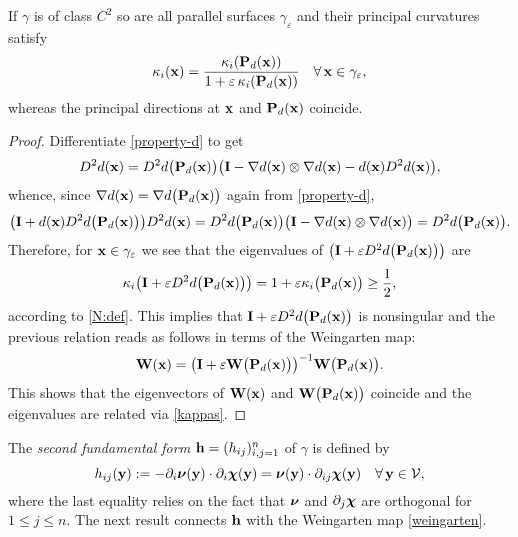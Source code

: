 \begin{lemma}\label{L:curv-parallel}
If $\gamma$ is of class $C^2$  so are all parallel surfaces $\gamma_\varepsilon$ and
their principal curvatures satisfy
%
\begin{equation}\label{kappas}
  \kappa_i({\bf x}) = \frac{\kappa_i({\bf P}_d({\bf x}))}{1+\varepsilon \, \kappa_i({\bf P}_d({\bf x}))}
  \quad\forall \, {\bf x}\in\gamma_\varepsilon, 
\end{equation}
%
whereas the principal directions at ${\bf x}$ and ${\bf P}_d({\bf x})$ coincide.
\end{lemma}
%
\begin{proof}  
Differentiate \eqref{property-d} to get
%
\[
D^2 d({\bf x}) = D^2d \big( {\bf P}_d({\bf x}) \big) \big({\bf I} - \nabla d({\bf x}) \otimes \nabla d({\bf x})
- d({\bf x}) D^2 d({\bf x}) \big),
\]
%
whence, since $\nabla d({\bf x}) = \nabla d \big({\bf P}_d({\bf x}) \big)$ again from
\eqref{property-d},
%
\[
\big( {\bf I} + d({\bf x}) D^2 d\big({\bf P}_d({\bf x}) \big) \big) D^2 d({\bf x})
= D^2 d\big({\bf P}_d({\bf x}) \big) \big( {\bf I} - \nabla d({\bf x}) \otimes \nabla d({\bf x}) \big)
= D^2 d\big({\bf P}_d({\bf x}) \big).
\]
%
Therefore, for ${\bf x}\in\gamma_\varepsilon$ we see that the eigenvalues of
$\big( {\bf I} + \varepsilon D^2 d\big({\bf P}_d({\bf x}) \big) \big)$ are
%
\[
\kappa_i\big( {\bf I} + \varepsilon D^2 d\big({\bf P}_d({\bf x}) \big) \big)=
1+\varepsilon \kappa_i \big({\bf P}_d({\bf x}) \big) \ge \frac12,
\]
%
according to \eqref{N:def}.
This implies that ${\bf I} + \varepsilon D^2 d\big({\bf P}_d({\bf x}) \big)$ is nonsingular and
the previous relation reads as follows in terms of the Weingarten map:
%
\[
{\bf W}({\bf x}) = \big( {\bf I} + \varepsilon {\bf W}\big({\bf P}_d({\bf x}) \big) \big)^{-1}
{\bf W} \big({\bf P}_d({\bf x}) \big).
\]
%
This shows that the eigenvectors of ${\bf W}({\bf x})$ and ${\bf W} \big({\bf P}_d({\bf x}) \big)$
coincide and the eigenvalues are related via \eqref{kappas}.
\end{proof}

The {\it second fundamental form}
${\bf h} = (h_{ij})_{i,j=1}^n$ of $\gamma$ is defined by
%
\[
h_{ij}({\bf y}) := -\partial_i {\boldsymbol \nu}({\bf y})\cdot\partial_i{\boldsymbol \chi}({\bf y})
= {\boldsymbol \nu}({\bf y}) \cdot \partial_{ij} {\boldsymbol \chi}({\bf y})
\quad\forall \, {\bf y}\in\mathcal{V},
\]
%
where the last equality relies on the fact that ${\boldsymbol \nu}$ and $\partial_j{\boldsymbol \chi}$
are orthogonal for $1\le j\le n$. The next result connects ${\bf h}$ with the
Weingarten map \eqref{weingarten}.

